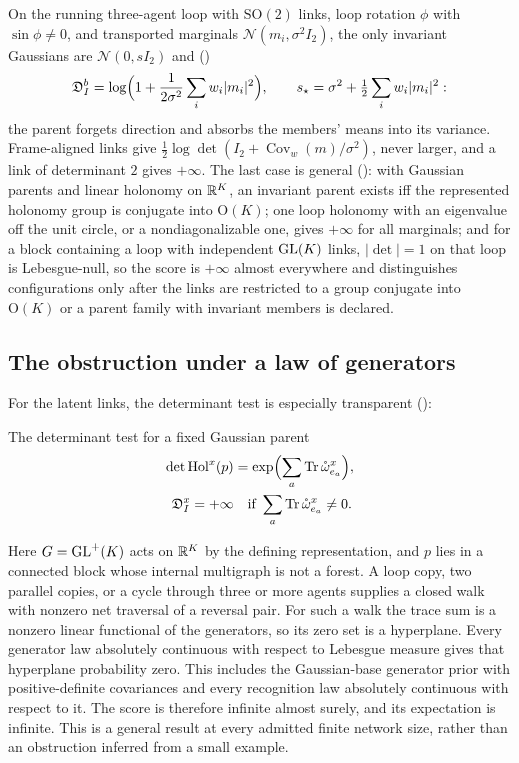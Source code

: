 On the running three-agent loop with $\mathrm{SO}(2)$ links, loop rotation $\phi$ with $\sin\phi\neq0$,
and transported marginals $\mathcal N(m_i,\sigma^2I_2)$, the only invariant Gaussians are
$\mathcal N(0,sI_2)$ and ()
\[
\mathfrak D^b_I=\log\Bigl(1+\frac{1}{2\sigma^2}\sum_iw_i\lvert m_i\rvert^2\Bigr),
\qquad
s_\star=\sigma^2+\tfrac12\sum_iw_i\lvert m_i\rvert^2:
\]
the parent forgets direction and absorbs the members' means into its variance. Frame-aligned links give
$\tfrac12\log\det(I_2+\operatorname{Cov}_w(m)/\sigma^2)$, never larger, and a link of determinant $2$
gives $+\infty$. The last case is general (): with Gaussian
parents and linear holonomy on $\mathbb R^K$, an invariant parent exists iff the represented holonomy group is
conjugate into $\mathrm O(K)$; one loop holonomy with an eigenvalue off the unit circle, or a
nondiagonalizable one, gives $+\infty$ for all marginals; and for a block containing a loop with
independent $\mathrm{GL}(K)$ links, $\lvert\det\rvert=1$ on that loop is Lebesgue-null, so the score is $+\infty$
almost everywhere and distinguishes configurations only after the links are restricted to a group
conjugate into $\mathrm O(K)$ or a parent family with invariant members is declared.

\subsection{The obstruction under a law of generators}

For the latent links, the determinant test is especially transparent
():
\begin{keyequation}{The determinant test for a fixed Gaussian parent}
\[
\begin{aligned}
\det\mathrm{Hol}^x(p)
&=\exp\Bigl(\sum_a\operatorname{Tr}\mathring\omega^x_{e_a}\Bigr),\\
\mathfrak D^x_I=+\infty
&\quad\text{if }\sum_a\operatorname{Tr}\mathring\omega^x_{e_a}\ne0.
\end{aligned}
\]
\end{keyequation}
Here $G=\mathrm{GL}^+(K)$ acts on $\mathbb R^K$ by the defining representation, and $p$ lies in a connected
block whose internal multigraph is not a forest. A loop copy, two parallel copies, or a cycle through
three or more agents supplies a closed walk with nonzero net traversal of a reversal pair. For such a
walk the trace sum is a nonzero linear functional of the generators, so its zero set is a hyperplane.
Every generator law absolutely continuous with respect to Lebesgue measure gives that hyperplane
probability zero. This includes the Gaussian-base generator prior with positive-definite covariances
and every recognition law absolutely continuous with respect to it. The score is therefore infinite
almost surely, and its expectation is infinite. This is a general result at every admitted finite
network size, rather than an obstruction inferred from a small example.

